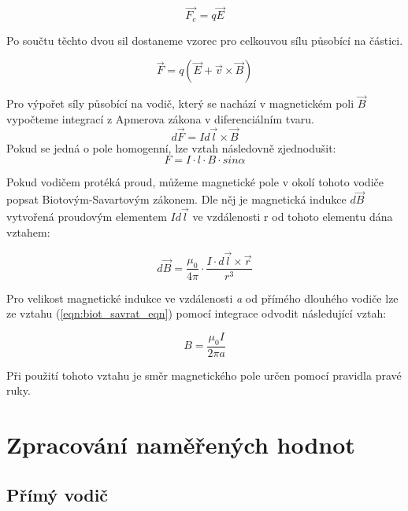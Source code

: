 \documentclass{praktikum}
\begin{document}
\begin{equation}
\label{eqn:electric_force}
\vec{F_e} = q\vec{E}
\end{equation}

Po součtu těchto dvou sil dostaneme vzorec pro celkouvou sílu působící na částici.

\begin{equation}
\label{lorenz_electric_sumforce}
\vec{F} = q(\vec{E}+\vec{v}\times\vec{B})
\end{equation}

\indent Pro výpořet síly působící na vodič, který se nachází v magnetickém poli $\vec{B}$ vypočteme integrací z Apmerova zákona v diferenciálním tvaru.
\begin{equation}
\label{eqn:amper_dif_eqn}
d\vec{F} = Id\vec{l}\times\vec{B}
\end{equation}
Pokud se jedná o pole homogenní, lze vztah následovně zjednodušit:
\begin{equation}
\label{eqn:editted_amper_dif_eqn}
F = I\cdot l \cdot B \cdot sin\alpha
\end{equation}

Pokud vodičem protéká proud, můžeme magnetické pole v okolí tohoto vodiče popsat Biotovým-Savartovým zákonem. Dle něj je magnetická indukce $d\vec{B}$ vytvořená proudovým elementem $Id\vec{l}$ ve vzdálenosti r od tohoto elementu dána vztahem:

\begin{equation}
\label{eqn:biot_savrat_eqn}
d\vec{B} = \frac{\mu _0}{4\pi} \cdot \frac{I\cdot d\vec{l}\times \vec{r}}{r^3}
\end{equation}

\indent Pro velikost magnetické indukce ve vzdálenosti \textit{a} od přímého dlouhého vodiče lze ze vztahu (\ref{eqn:biot_savrat_eqn}) pomocí integrace odvodit následující vztah:

\begin{equation}
\label{eqn:long_wire_biot_savrat}
B = \frac{\mu _0 I}{2\pi a}
\end{equation}

Při použití tohoto vztahu je směr magnetického pole určen pomocí pravidla pravé ruky.

\section{Zpracování naměřených hodnot}

\subsection{Přímý vodič}
\end{document}
